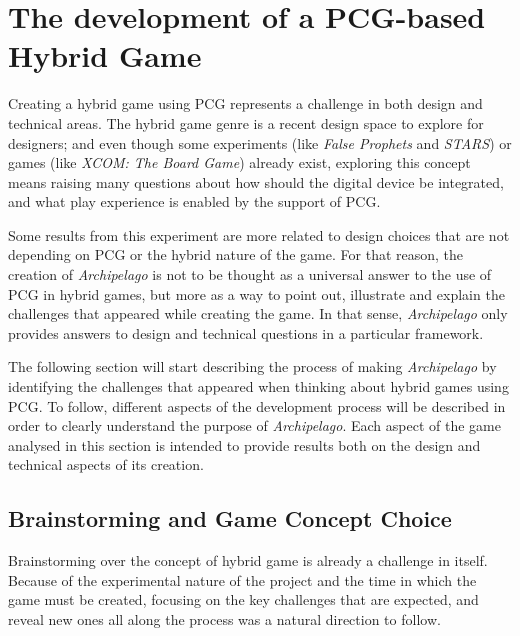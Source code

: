 \chapter{The development of a PCG-based Hybrid Game}
Creating a hybrid game using PCG represents a challenge in both design and technical areas. The hybrid game genre is a recent design space to explore for designers; and even though some experiments (like \textit{False Prophets} and \textit{STARS}) or games (like \textit{XCOM: The Board Game}) already exist, exploring this concept means raising many questions about how should the digital device be integrated, and what play experience is enabled by the support of PCG.

Some results from this experiment are more related to design choices that are not depending on PCG or the hybrid nature of the game. For that reason, the creation of \textit{Archipelago} is not to be thought as a universal answer to the use of PCG in hybrid games, but more as a way to point out, illustrate and explain the challenges that appeared while creating the game. In that sense, \textit{Archipelago} only provides answers to design and technical questions in a particular framework.

The following section will start describing the process of making \textit{Archipelago} by identifying the challenges that appeared when thinking about hybrid games using PCG. To follow, different aspects of the development process will be described in order to clearly understand the purpose of \textit{Archipelago}. Each aspect of the game analysed in this section is intended to provide results both on the design and technical aspects of its creation. 
\section{Brainstorming and Game Concept Choice}
Brainstorming over the concept of hybrid game is already a challenge in itself. Because of the experimental nature of the project and the time in which the game must be created, focusing on the key challenges that are expected, and reveal new ones all along the process was a natural direction to follow.
